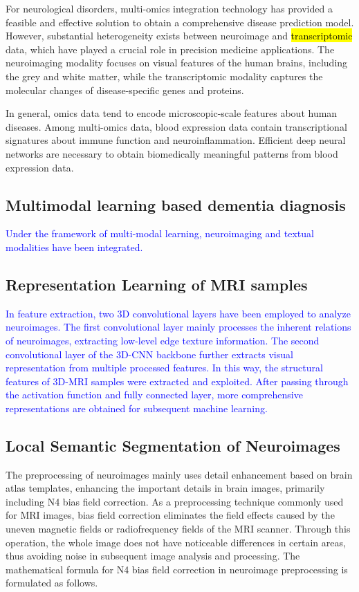 \documentclass[lettersize,journal]{IEEEtran}
\begin{document}
    For neurological disorders, multi-omics integration technology has provided a feasible and effective solution to obtain a comprehensive disease prediction model. However, substantial heterogeneity exists between neuroimage and \hl{transcriptomic} data, which have played a crucial role in precision medicine applications.
    The neuroimaging modality focuses on visual features of the human brains, including the grey and white matter, while the transcriptomic modality captures the molecular changes of disease-specific genes and proteins.
    
    In general, omics data tend to encode microscopic-scale features about human diseases. Among multi-omics data, blood expression data contain transcriptional signatures about immune function and neuroinflammation. Efficient deep neural networks are necessary to obtain biomedically meaningful patterns from blood expression data.
    
\subsection{Multimodal learning based dementia diagnosis}

    \textcolor{blue}{Under the framework of multi-modal learning, neuroimaging and textual modalities have been integrated.}

\subsection{Representation Learning of MRI samples}

    \textcolor{blue}{In feature extraction, two 3D convolutional layers have been employed to analyze neuroimages. The first convolutional layer mainly processes the inherent relations of neuroimages, extracting low-level edge texture information. The second convolutional layer of the 3D-CNN backbone further extracts visual representation from multiple processed features. In this way, the structural features of 3D-MRI samples were extracted and exploited.
    After passing through the activation function and fully connected layer, more comprehensive representations are obtained for subsequent machine learning.}

    
    \subsection{Local Semantic Segmentation of Neuroimages}

    The preprocessing of neuroimages mainly uses detail enhancement based on brain atlas templates, enhancing the important details in brain images, primarily including N4 bias field correction. As a preprocessing technique commonly used for MRI images, bias field correction eliminates the field effects caused by the uneven magnetic fields or radiofrequency fields of the MRI scanner. Through this operation, the whole image does not have noticeable differences in certain areas, thus avoiding noise in subsequent image analysis and processing. The mathematical formula for N4 bias field correction in neuroimage preprocessing is formulated as follows.
\end{document}
